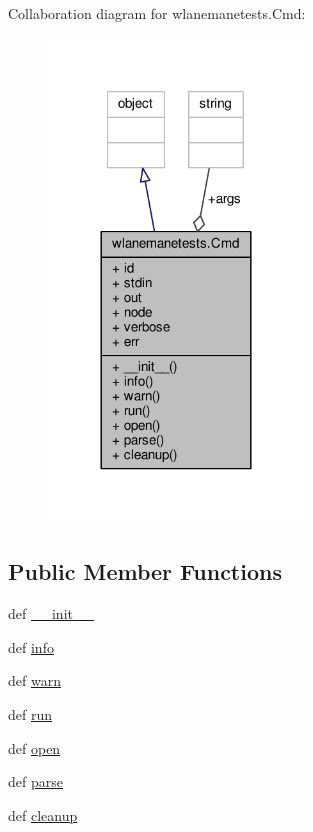 Collaboration diagram for wlanemanetests.\+Cmd\+:
\nopagebreak
\begin{figure}[H]
\begin{center}
\leavevmode
\includegraphics[width=192pt]{classwlanemanetests_1_1_cmd__coll__graph}
\end{center}
\end{figure}
\subsection*{Public Member Functions}
\begin{DoxyCompactItemize}
\item 
def \hyperlink{classwlanemanetests_1_1_cmd_acd8fc0a7579f5e2f12875ddfbafa5382}{\+\_\+\+\_\+init\+\_\+\+\_\+}
\item 
def \hyperlink{classwlanemanetests_1_1_cmd_a6b12b2c0c67f717c73292b5dd4220763}{info}
\item 
def \hyperlink{classwlanemanetests_1_1_cmd_ac5a04cd30be3cce2e85be31167112d95}{warn}
\item 
def \hyperlink{classwlanemanetests_1_1_cmd_a16f428c0a4dff9a7295e11b47350af29}{run}
\item 
def \hyperlink{classwlanemanetests_1_1_cmd_a528f6b2acf2d5c8e40af98a32dd3b73a}{open}
\item 
def \hyperlink{classwlanemanetests_1_1_cmd_a416225dd2ad7a266d7252602aaaef2e2}{parse}
\item 
def \hyperlink{classwlanemanetests_1_1_cmd_a87a05cf4e6499cd488ed5194344795ae}{cleanup}
\end{DoxyCompactItemize}
